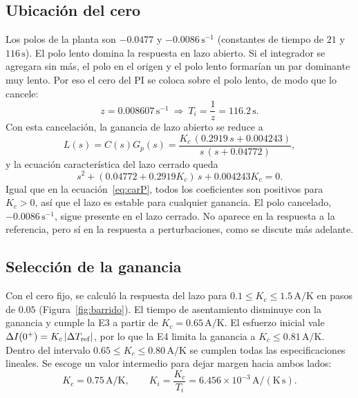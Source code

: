 \documentclass[journal,twocolumn]{IEEEtran}
\begin{document}
\subsection{Ubicación del cero}
Los polos de la planta son $-0.0477$ y $-0.0086\,\mathrm{s^{-1}}$ (constantes de tiempo de $21$ y $116\,\mathrm s$). El polo lento domina la respuesta en lazo abierto. Si el integrador se agregara sin más, el polo en el origen y el polo lento formarían un par dominante muy lento. Por eso el cero del PI se coloca sobre el polo lento, de modo que lo cancele:
\begin{equation}
z=0.008607\,\mathrm{s^{-1}}\ \Rightarrow\ T_i=\frac{1}{z}=116.2\,\mathrm s.\label{eq:cero}
\end{equation}
Con esta cancelación, la ganancia de lazo abierto se reduce a
\begin{equation}
L(s)=C(s)G_p(s)=\frac{K_c\,(0.2919\,s+0.004243)}{s\,(s+0.04772)},\label{eq:L}
\end{equation}
y la ecuación característica del lazo cerrado queda
\begin{equation}
s^2+(0.04772+0.2919K_c)\,s+0.004243K_c=0.\label{eq:carPI}
\end{equation}
Igual que en la ecuación~\eqref{eq:carP}, todos los coeficientes son positivos para $K_c>0$, así que el lazo es estable para cualquier ganancia. El polo cancelado, $-0.0086\,\mathrm{s^{-1}}$, sigue presente en el lazo cerrado. No aparece en la respuesta a la referencia, pero sí en la respuesta a perturbaciones, como se discute más adelante.

\subsection{Selección de la ganancia}
Con el cero fijo, se calculó la respuesta del lazo para $0.1\le K_c\le1.5\,\mathrm{A/K}$ en pasos de $0.05$ (Figura~\ref{fig:barrido}). El tiempo de asentamiento disminuye con la ganancia y cumple la E3 a partir de $K_c=0.65\,\mathrm{A/K}$. El esfuerzo inicial vale $\Delta I(0^+)=K_c\,|\Delta T_{\rm ref}|$, por lo que la E4 limita la ganancia a $K_c\le0.81\,\mathrm{A/K}$. Dentro del intervalo $0.65\le K_c\le0.80\,\mathrm{A/K}$ se cumplen todas las especificaciones lineales. Se escoge un valor intermedio para dejar margen hacia ambos lados:
\begin{equation}
K_c=0.75\,\mathrm{A/K},\qquad K_i=\frac{K_c}{T_i}=6.456\times10^{-3}\,\mathrm{A/(K\,s)}.\label{eq:ganancias}
\end{equation}
\end{document}
